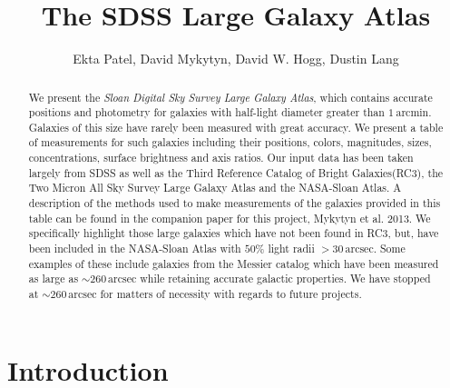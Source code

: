 \documentclass[12pt,preprint,pdftex]{aastex}
\newcounter{address}
\newcommand{\project}[1]{\textsl{#1}}
\newcommand{\units}[1]{\mathrm{#1}}
\renewcommand{\arcmin}{\units{arcmin}}
\renewcommand{\arcsec}{\units{arcsec}}
\begin{document}
\title{
       The SDSS Large Galaxy Atlas
      }
\author{
        Ekta Patel\altaffilmark{\ref{CCPP}},
        David Mykytyn\altaffilmark{\ref{CCPP}},
        David W. Hogg\altaffilmark{\ref{CCPP},\ref{MPIA},\ref{email}},
        Dustin Lang\altaffilmark{\ref{CMU}}
       }
\setcounter{address}{1}

\begin{abstract}
We present the \project{Sloan Digital Sky Survey Large Galaxy Atlas}, which contains
accurate positions and photometry for galaxies with half-light diameter
greater than $1~\arcmin$. Galaxies of this size have rarely been measured with great accuracy. We present a table of measurements for such galaxies including their positions, colors, magnitudes, sizes, concentrations, surface brightness and axis ratios. Our input data has been taken largely from SDSS as well as the Third Reference Catalog of Bright Galaxies(RC3), the Two Micron All Sky Survey Large Galaxy Atlas and the NASA-Sloan Atlas. A description of the methods used to make measurements of the galaxies provided in this table can be found in the companion paper for this project, Mykytyn et al. 2013. We specifically highlight those large galaxies which have not been found in RC3, but, have been included in the NASA-Sloan Atlas with $50\%$ light radii $> 30\,\arcsec$. Some examples of these include galaxies from the Messier catalog which have been measured as large as $\sim 260\,\arcsec$ while retaining accurate galactic properties. We have stopped at $\sim 260\,\arcsec$ for matters of necessity with regards to future projects.

\end{abstract}

\section{Introduction}
\end{document}
